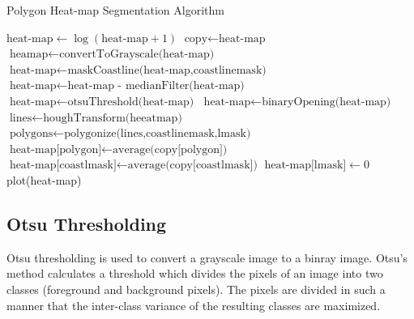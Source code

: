 \documentclass{article}
\begin{document}
\begin{algorithm}
 \caption{Polygon Heat-map Segmentation Algorithm}\label{euclid}
 \begin{algorithmic}[1]
 \State $\textrm{heat-map} \gets \log(\textrm{heat-map}+1)$
 \State $\textrm{copy} \gets \textrm{heat-map}$
 \State $\textrm{heamap} \gets \textrm{convertToGrayscale(heat-map)}$
 \State $\textrm{heat-map} \gets \textrm{maskCoastline(heat-map,coastlinemask)}$
 \State $\textrm{heat-map} \gets \textrm{heat-map - medianFilter(heat-map)}$ 
 \State $\textrm{heat-map} \gets \textrm{otsuThreshold(heat-map)}$
 \State $\textrm{heat-map} \gets \textrm{binaryOpening(heat-map)}$
 \State $\textrm{lines} \gets \textrm{houghTransform(heeatmap)}$
 \State $\textrm{polygons} \gets \textrm{polygonize(lines,coastlinemask,lmask)}$
     \State $\textrm{heat-map[polygon]} \gets \textrm{average(copy[polygon])}$ 
 \EndFor
 \State $\textrm{heat-map[coastlmask]} \gets \textrm{average(copy[coastlmask])}$
 \State $\textrm{heat-map[lmask]} \gets 0$
 \State plot(heat-map)
 
 \EndProcedure
 \end{algorithmic}
 \end{algorithm}


\subsection{Otsu Thresholding}
Otsu thresholding is used to convert a grayscale image to a binray image. Otsu's method calculates a threshold which divides 
the pixels of an image into two classes (foreground and background pixels). The pixels are divided in such a manner that the inter-class variance 
of the resulting classes are maximized. 
\end{document}
